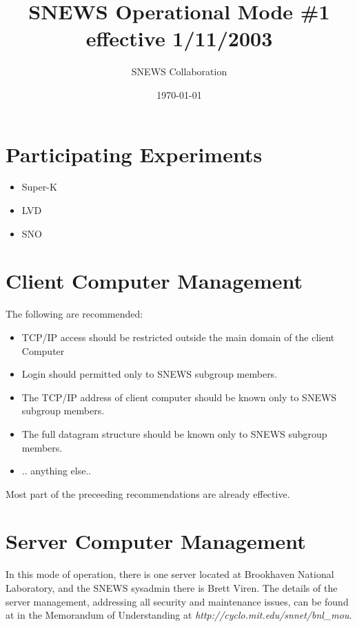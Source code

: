 \documentclass{article}
\begin{document}
\title{SNEWS Operational Mode \#1 effective 1/11/2003}         
\author{SNEWS Collaboration}
\date{\today}
\maketitle

\section{Participating Experiments}

\begin{itemize}
\item Super-K
\item LVD
\item SNO
\end{itemize}

\section{Client Computer Management}

The following are recommended:

\begin{itemize}
\item TCP/IP access should be restricted outside the main domain of the client Computer
\item Login should permitted only to SNEWS subgroup members.
\item The TCP/IP address of client computer should be known only to SNEWS subgroup members.
\item The full datagram structure should be known only to SNEWS subgroup members.
\item .. anything else..
\end{itemize}
Most part of the preceeding recommendations are already effective.

\section{Server Computer Management}

In this mode of operation, there is one server located at Brookhaven
National Laboratory, and the SNEWS sysadmin there is Brett Viren.
The details of the server management, addressing all
security and maintenance issues, can be found at
in the Memorandum of Understanding at
{\it http://cyclo.mit.edu/snnet/bnl\_mou}.
\end{document}
